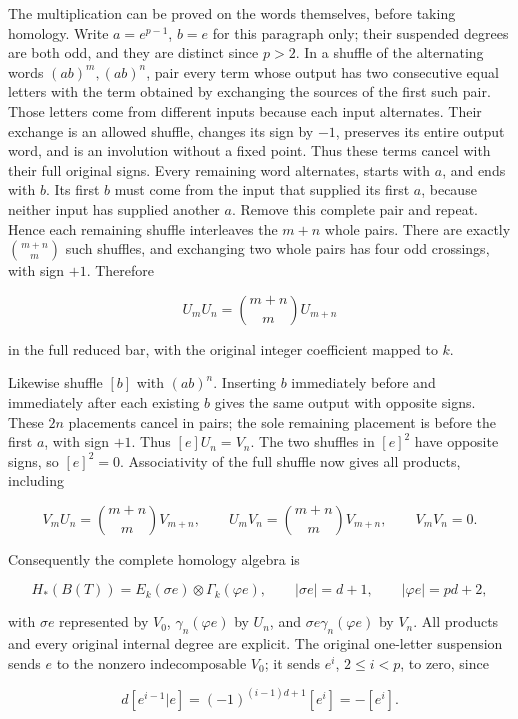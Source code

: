 The multiplication can be proved on the words themselves, before taking homology. Write \(a=e^{p-1}\), \(b=e\) for this paragraph only; their suspended degrees are both odd, and they are distinct since \(p>2\). In a shuffle of the alternating words \((ab)^m,(ab)^n\), pair every term whose output has two consecutive equal letters with the term obtained by exchanging the sources of the first such pair. Those letters come from different inputs because each input alternates. Their exchange is an allowed shuffle, changes its sign by \(-1\), preserves its entire output word, and is an involution without a fixed point. Thus these terms cancel with their full original signs. Every remaining word alternates, starts with \(a\), and ends with \(b\). Its first \(b\) must come from the input that supplied its first \(a\), because neither input has supplied another \(a\). Remove this complete pair and repeat. Hence each remaining shuffle interleaves the \(m+n\) whole pairs. There are exactly \(\binom{m+n}{m}\) such shuffles, and exchanging two whole pairs has four odd crossings, with sign \(+1\). Therefore

\[
 U_m U_n=\binom{m+n}{m}U_{m+n}
\]

in the full reduced bar, with the original integer coefficient mapped to \(k\).

Likewise shuffle \([b]\) with \((ab)^n\). Inserting \(b\) immediately before and immediately after each existing \(b\) gives the same output with opposite signs. These \(2n\) placements cancel in pairs; the sole remaining placement is before the first \(a\), with sign \(+1\). Thus \([e]U_n=V_n\). The two shuffles in \([e]^2\) have opposite signs, so \([e]^2=0\). Associativity of the full shuffle now gives all products, including

\[
 V_m U_n=\binom{m+n}{m}V_{m+n},\qquad
 U_m V_n=\binom{m+n}{m}V_{m+n},\qquad V_m V_n=0.
\]

Consequently the complete homology algebra is

\[
 H_*(B(T))=E_k(\sigma e)\otimes\Gamma_k(\varphi e),
 \qquad |\sigma e|=d+1,\qquad |\varphi e|=pd+2,
\]

with \(\sigma e\) represented by \(V_0\), \(\gamma_n(\varphi e)\) by \(U_n\), and \(\sigma e\gamma_n(\varphi e)\) by \(V_n\). All products and every original internal degree are explicit. The original one-letter suspension sends \(e\) to the nonzero indecomposable \(V_0\); it sends \(e^i\), \(2\leq i<p\), to zero, since

\[
 d[e^{i-1}|e]=(-1)^{(i-1)d+1}[e^i]=-[e^i].
\]

